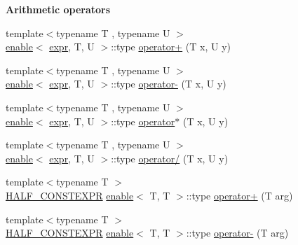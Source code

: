 \begin{Indent}\textbf{ Arithmetic operators}\par
\begin{DoxyCompactItemize}
\item 
{\footnotesize template$<$typename T , typename U $>$ }\\\hyperlink{structhalf__float_1_1detail_1_1enable}{enable}$<$ \hyperlink{structhalf__float_1_1detail_1_1expr}{expr}, T, U $>$\+::type \hyperlink{namespacehalf__float_1_1detail_ab68ed4e1f0a86aebf4337957f1639070}{operator+} (T x, U y)
\item 
{\footnotesize template$<$typename T , typename U $>$ }\\\hyperlink{structhalf__float_1_1detail_1_1enable}{enable}$<$ \hyperlink{structhalf__float_1_1detail_1_1expr}{expr}, T, U $>$\+::type \hyperlink{namespacehalf__float_1_1detail_aa44e802bd306be8f49dd7d193630253e}{operator-\/} (T x, U y)
\item 
{\footnotesize template$<$typename T , typename U $>$ }\\\hyperlink{structhalf__float_1_1detail_1_1enable}{enable}$<$ \hyperlink{structhalf__float_1_1detail_1_1expr}{expr}, T, U $>$\+::type \hyperlink{namespacehalf__float_1_1detail_a39439907cd8f62aa71ed6e1e50f1c860}{operator$\ast$} (T x, U y)
\item 
{\footnotesize template$<$typename T , typename U $>$ }\\\hyperlink{structhalf__float_1_1detail_1_1enable}{enable}$<$ \hyperlink{structhalf__float_1_1detail_1_1expr}{expr}, T, U $>$\+::type \hyperlink{namespacehalf__float_1_1detail_a6cea2c4b4740528b2f86fb55990107bf}{operator/} (T x, U y)
\item 
{\footnotesize template$<$typename T $>$ }\\\hyperlink{half_8hpp_ace3116a3e2cd66dd15780b92060987c7}{H\+A\+L\+F\+\_\+\+C\+O\+N\+S\+T\+E\+X\+PR} \hyperlink{structhalf__float_1_1detail_1_1enable}{enable}$<$ T, T $>$\+::type \hyperlink{namespacehalf__float_1_1detail_a7afa8822c81700c74bf8be208cded547}{operator+} (T arg)
\item 
{\footnotesize template$<$typename T $>$ }\\\hyperlink{half_8hpp_ace3116a3e2cd66dd15780b92060987c7}{H\+A\+L\+F\+\_\+\+C\+O\+N\+S\+T\+E\+X\+PR} \hyperlink{structhalf__float_1_1detail_1_1enable}{enable}$<$ T, T $>$\+::type \hyperlink{namespacehalf__float_1_1detail_a8479fc53f679b85f40e6d511706627c4}{operator-\/} (T arg)
\end{DoxyCompactItemize}
\end{Indent}

